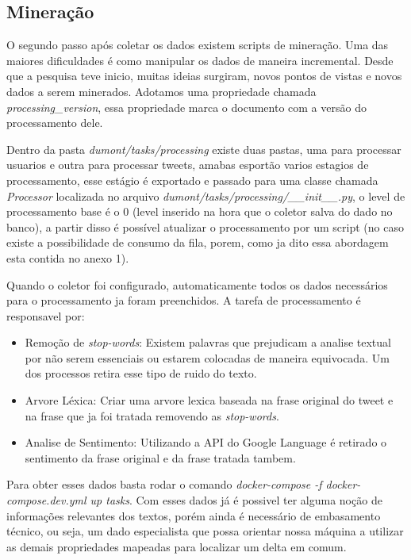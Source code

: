 \subsection{Mineração}
O segundo passo após coletar os dados existem scripts de mineração. Uma das maiores dificuldades é como manipular os dados de maneira incremental. Desde que a pesquisa teve inicio, muitas ideias surgiram, novos pontos de vistas e novos dados a serem minerados. Adotamos uma propriedade chamada \textit{processing_version}, essa propriedade marca o documento com a versão do processamento dele.

Dentro da pasta \textit{dumont/tasks/processing} existe duas pastas, uma para processar usuarios e outra para processar tweets, amabas esportão varios estagios de processamento, esse estágio é exportado e passado para uma classe chamada \textit{Processor} localizada no arquivo \textit{dumont/tasks/processing/__init__.py}, o level de processamento base é o 0 (level inserido na hora que o coletor salva do dado no banco), a partir disso é possível atualizar o processamento por um script (no caso existe a possibilidade de consumo da fila, porem, como ja dito essa abordagem esta contida no anexo 1).

Quando o coletor foi configurado, automaticamente todos os dados necessários para o processamento ja foram preenchidos. A tarefa de processamento é responsavel por:

\begin{itemize}
    \item Remoção de \textit{stop-words}: Existem palavras que prejudicam a analise textual por não serem essenciais ou estarem colocadas de maneira equivocada. Um dos processos retira esse tipo de ruido do texto.
    \item Arvore Léxica: Criar uma arvore lexica baseada na frase original do tweet e na frase que ja foi tratada removendo as \textit{stop-words}.
    \item Analise de Sentimento: Utilizando a API do Google Language é retirado o sentimento da frase original e da frase tratada tambem.
\end{itemize}

Para obter esses dados basta rodar o comando \textit{docker-compose -f docker-compose.dev.yml up tasks}. Com esses dados já é possivel ter alguma noção de informações relevantes dos textos, porém ainda é necessário de embasamento técnico, ou seja, um dado especialista que possa orientar nossa máquina a utilizar as demais propriedades mapeadas para localizar um delta em comum.

